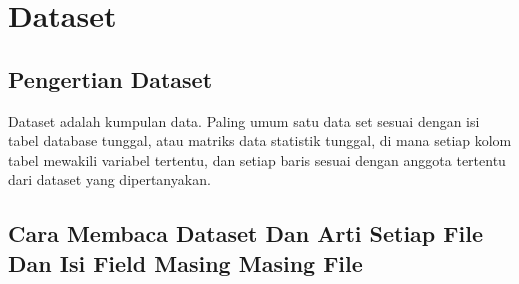 \section{Dataset}
\subsection{Pengertian Dataset}
Dataset adalah kumpulan data. Paling umum satu data set sesuai dengan isi tabel database tunggal, atau matriks data statistik tunggal, di mana setiap kolom tabel mewakili variabel tertentu, dan setiap baris sesuai dengan anggota tertentu dari dataset yang dipertanyakan.
\subsection{Cara Membaca Dataset Dan Arti Setiap File Dan Isi Field Masing Masing File}
